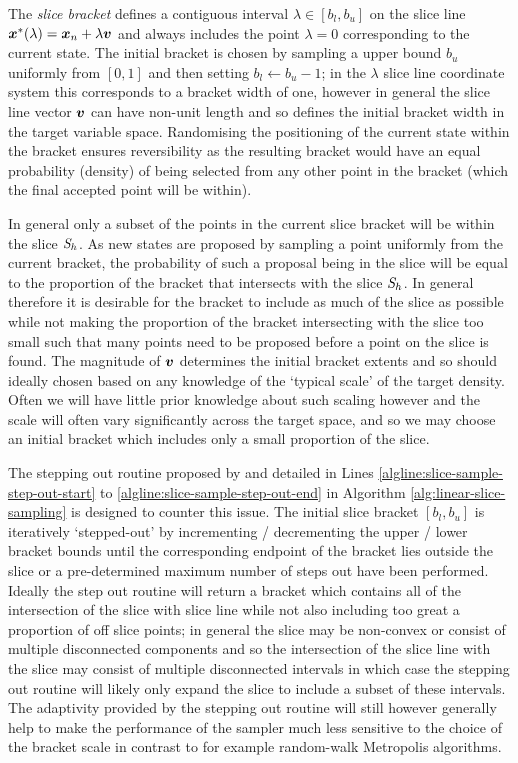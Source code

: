 The \emph{slice bracket} defines a contiguous interval $\lambda \in [b_l,b_u]$ on the slice line $\boldsymbol{x}^*(\lambda) = \boldsymbol{x}_n + \lambda \boldsymbol{v}$ and always includes the point $\lambda = 0$ corresponding to the current state. The initial bracket is chosen by sampling a upper bound $b_u$ uniformly from $[0, 1]$ and then setting $b_l \gets b_u - 1$; in the $\lambda$ slice line coordinate system this corresponds to a bracket width of one, however in general the slice line vector $\boldsymbol{v}$ can have non-unit length and so defines the initial bracket width in the target variable space. Randomising the positioning of the current state within the bracket ensures reversibility as the resulting bracket would have an equal probability (density) of being selected from any other point in the bracket (which the final accepted point will be within).

In general only a subset of the points in the current slice bracket will be within the slice $\mathit{S}_h$. As new states are proposed by sampling a point uniformly from the current bracket, the probability of such a proposal being in the slice will be equal to the proportion of the bracket that intersects with the slice $\mathit{S}_h$. In general therefore it is desirable for the bracket to include as much of the slice as possible while not making the proportion of the bracket intersecting with the slice too small such that many points need to be proposed before a point on the slice is found. The magnitude of $\boldsymbol{v}$ determines the initial bracket extents and so should ideally chosen based on any knowledge of the `typical scale' of the target density. Often we will have little prior knowledge about such scaling however and the scale will often vary significantly across the target space, and so we may choose an initial bracket which includes only a small proportion of the slice.

The stepping out routine proposed by \citep{neal2003slice} and detailed in Lines \ref{algline:slice-sample-step-out-start} to \ref{algline:slice-sample-step-out-end} in Algorithm \ref{alg:linear-slice-sampling} is designed to counter this issue. The initial slice bracket $[b_l, b_u]$ is iteratively `stepped-out' by incrementing / decrementing the upper / lower bracket bounds until the corresponding endpoint of the bracket lies outside the slice or a pre-determined maximum number of steps out have been performed. Ideally the step out routine will return a bracket which contains all of the intersection of the slice with slice line while not also including too great a proportion of off slice points; in general the slice may be non-convex or consist of multiple disconnected components and so the intersection of the slice line with the slice may consist of multiple disconnected intervals in which case the stepping out routine will likely only expand the slice to include a subset of these intervals. The adaptivity provided by the stepping out routine will still however generally help to make the performance of the sampler much less sensitive to the choice of the bracket scale in contrast to for example random-walk Metropolis algorithms. %

